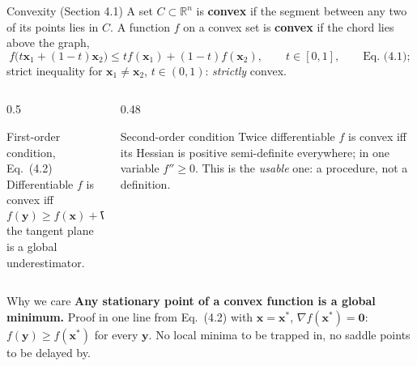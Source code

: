 \documentclass[10pt,aspectratio=169]{beamer}
\begin{document}
\begin{frame}{Convexity (Section 4.1)}
A set $C\subset\mathbb{R}^n$ is \textbf{convex} if the segment between any
two of its points lies in $C$.  A function $f$ on a convex set is
\textbf{convex} if the chord lies above the graph,
\[
  f\bigl(t\bm{x}_1+(1-t)\bm{x}_2\bigr)\le t f(\bm{x}_1)+(1-t)f(\bm{x}_2),
  \qquad t\in[0,1],\qquad\text{Eq.~(4.1)};
\]
strict inequality for $\bm{x}_1\ne\bm{x}_2$, $t\in(0,1)$: \emph{strictly} convex.
\vspace{3pt}
\begin{columns}
\begin{column}{0.5\textwidth}
\begin{block}{First-order condition, Eq.~(4.2)}
Differentiable $f$ is convex iff
\[
  f(\bm{y})\ge f(\bm{x})+\nabla f(\bm{x})^T(\bm{y}-\bm{x})
  \quad\forall\,\bm{x},\bm{y}:
\]
the tangent plane is a global underestimator.
\end{block}
\end{column}
\begin{column}{0.48\textwidth}
\begin{block}{Second-order condition}
Twice differentiable $f$ is convex iff its Hessian is positive
semi-definite everywhere; in one variable $f''\ge0$.  This is the
\emph{usable} one: a procedure, not a definition.
\end{block}
\end{column}
\end{columns}
\vspace{4pt}
\begin{block}{Why we care}
\textbf{Any stationary point of a convex function is a global minimum.}
Proof in one line from Eq.~(4.2) with $\bm{x}=\bm{x}^*$,
$\nabla f(\bm{x}^*)=\bm{0}$: $f(\bm{y})\ge f(\bm{x}^*)$ for every $\bm{y}$.
No local minima to be trapped in, no saddle points to be delayed by.
\end{block}
\end{frame}
\end{document}
